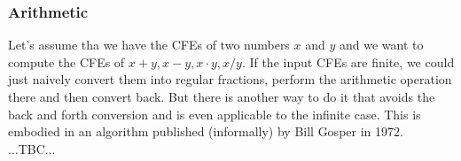 %


















\subsubsection{Arithmetic}
Let's assume tha we have the CFEs of two numbers $x$ and $y$ and we want to compute the CFEs of $x + y, x - y, x \cdot y, x / y$. If the input CFEs are finite, we could just naively convert them into regular fractions, perform the arithmetic operation there and then convert back. But there is another way to do it that avoids the back and forth conversion and is even applicable to the infinite case. This is embodied in an algorithm published (informally) by Bill Gosper in 1972. ...TBC...

